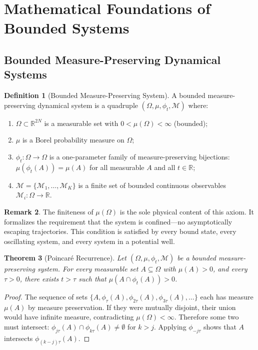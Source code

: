 \documentclass[11pt,twocolumn,a4paper]{article}
\newtheorem{theorem}{Theorem}[section]
\theoremstyle{definition}
\newtheorem{definition}[theorem]{Definition}
\newtheorem{remark}[theorem]{Remark}
\newcommand{\Real}{\mathbb{R}}
\newcommand{\calM}{\mathcal{M}}
\begin{document}
\section{Mathematical Foundations of Bounded Systems}
\label{sec:foundations}

\subsection{Bounded Measure-Preserving Dynamical Systems}

\begin{definition}[Bounded Measure-Preserving System]
A bounded measure-preserving dynamical system is a quadruple $(\Omega, \mu, \phi_t, \calM)$ where:
\begin{enumerate}[nosep,label=(\roman*)]
\item $\Omega \subset \Real^{2N}$ is a measurable set with $0 < \mu(\Omega) < \infty$ (bounded);
\item $\mu$ is a Borel probability measure on $\Omega$;
\item $\phi_t : \Omega \to \Omega$ is a one-parameter family of measure-preserving bijections: $\mu(\phi_t(A)) = \mu(A)$ for all measurable $A$ and all $t \in \Real$;
\item $\calM = \{\calM_1, \ldots, \calM_K\}$ is a finite set of bounded continuous observables $\calM_i : \Omega \to \Real$.
\end{enumerate}
\end{definition}

\begin{remark}
The finiteness of $\mu(\Omega)$ is the sole physical content of this axiom. It formalizes the requirement that the system is confined—no asymptotically escaping trajectories. This condition is satisfied by every bound state, every oscillating system, and every system in a potential well.
\end{remark}

\begin{theorem}[Poincaré Recurrence]
\label{thm:poincare}
Let $(\Omega, \mu, \phi_t, \calM)$ be a bounded measure-preserving system. For every measurable set $A \subseteq \Omega$ with $\mu(A) > 0$, and every $\tau > 0$, there exists $t > \tau$ such that $\mu(A \cap \phi_t(A)) > 0$.
\end{theorem}

\begin{proof}
The sequence of sets $\{A, \phi_\tau(A), \phi_{2\tau}(A), \phi_{3\tau}(A), \ldots\}$ each has measure $\mu(A)$ by measure preservation. If they were mutually disjoint, their union would have infinite measure, contradicting $\mu(\Omega) < \infty$. Therefore some two must intersect: $\phi_{j\tau}(A) \cap \phi_{k\tau}(A) \neq \emptyset$ for $k > j$. Applying $\phi_{-j\tau}$ shows that $A$ intersects $\phi_{(k-j)\tau}(A)$.
\end{proof}
\end{document}
